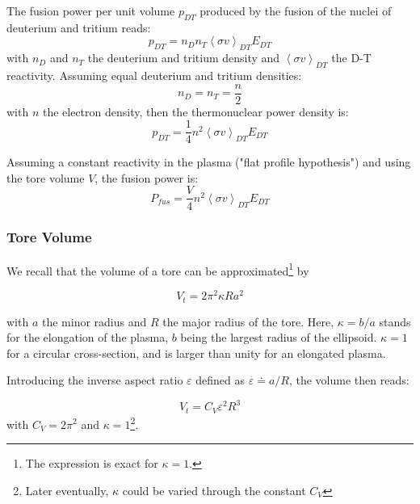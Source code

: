 The fusion power per unit volume $p_{DT}$ produced by the fusion of the nuclei of deuterium and tritium reads: 
\begin{equation*}
  p_{DT} = n_D n_T \left< \sigma v \right>_{DT} E_{DT}
\end{equation*}
with $n_D$ and $n_T$ the deuterium and tritium density and $\left< \sigma v \right>_{DT}$ the D-T reactivity. Assuming equal deuterium and tritium densities:
\begin{equation*}
  n_D = n_T = \frac{n}{2}
\end{equation*}
with $n$ the electron density, then the thermonuclear power density is:
\begin{equation*}
  p_{DT} = \frac{1}{4} n^2 \left< \sigma v \right>_{DT} E_{DT}
\end{equation*}

Assuming a constant reactivity in the plasma ("flat profile hypothesis") and using the tore volume $V$, the fusion power is: 
\begin{equation}
  P_{fus} = \frac{V}{4}
    n^2 \left< \sigma v \right>_{DT} E_{DT}
\end{equation}

\subsubsection{Tore Volume}

We recall that the volume of a tore can be approximated\footnote{The expression is exact for $\kappa=1$.} by 

\begin{equation}
    V_t = 2\pi^2 \kappa R a^2
\end{equation}

\noindent
with $a$ the minor radius and $R$ the major radius of the tore. Here, $\kappa=b/a$ stands for the elongation of the plasma, $b$ being the largest radius of the ellipsoid. $\kappa=1$ for a circular cross-section, and is larger than unity for an elongated plasma.

Introducing the inverse aspect ratio $\varepsilon$ defined as $\varepsilon  \doteq a /R$, the volume then reads:

\begin{equation}
    \boxed{V_t = C_V \varepsilon^2 R^3}
    \label{eq:tore_volume}
\end{equation}
\noindent
with $C_V = 2\pi^2$ and $\kappa=1$\footnote{Later eventually, $\kappa$ could be varied through the constant $C_V$ }. 

